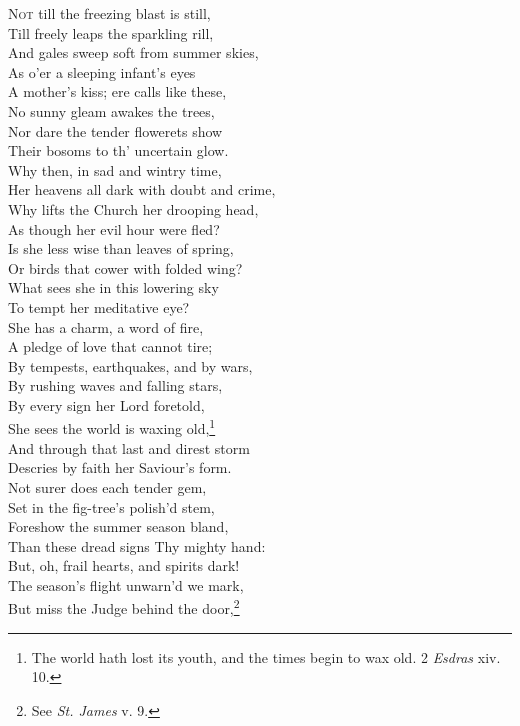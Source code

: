 \textsc{Not} till the freezing blast is still, \\
 Till freely leaps the sparkling rill, \\
 And gales sweep soft from summer skies, \\
 As o’er a sleeping infant’s eyes \\
 A mother’s kiss; ere calls like these, \\
 No sunny gleam awakes the trees, \\
 Nor dare the tender flowerets show \\
 Their bosoms to th’ uncertain glow. \\
  Why then, in sad and wintry time, \\
 Her heavens all dark with doubt and crime, \\
 Why lifts the Church her drooping head, \\
 As though her evil hour were fled? \\
 Is she less wise than leaves of spring, \\
 Or birds that cower with folded wing? \\
 What sees she in this lowering sky \\
 To tempt her meditative eye? \\
  She has a charm, a word of fire, \\
 A pledge of love that cannot tire; \\
 By tempests, earthquakes, and by wars, \\
 By rushing waves and falling stars, \\
 By every sign her Lord foretold, \\
 She sees the world is waxing old,\footnote{The world hath lost its youth, and the times begin to wax old. 2 \emph{Esdras} xiv. 10.} \\
 And through that last and direst storm \\
 Descries by faith her Saviour’s form. \\
  Not surer does each tender gem, \\
 Set in the fig-tree’s polish’d stem, \\
 Foreshow the summer season bland, \\
 Than these dread signs Thy mighty hand: \\
 But, oh, frail hearts, and spirits dark! \\
 The season’s flight unwarn’d we mark, \\
 But miss the Judge behind the door,\footnote{See \emph{St. James} v. 9.} \\
